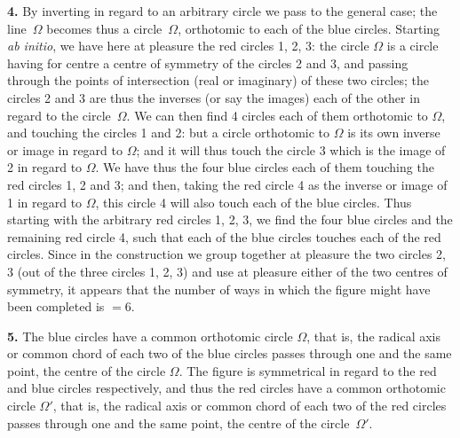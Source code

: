 \documentclass[12pt,a4paper]{article}
\begin{document}
\textbf{4.} By inverting in regard to an arbitrary circle we pass to the general case; the line~$\Omega$ becomes thus a circle~$\Omega$, orthotomic to each of the blue circles. Starting \textit{ab initio}, we have here at pleasure the red circles 1, 2, 3: the circle $\Omega$ is a circle having for centre a centre of symmetry of the circles 2 and 3, and passing through the points of intersection (real or imaginary) of these two circles; the circles 2 and 3 are thus the inverses (or say the images) each of the other in regard to the circle~$\Omega$. We can then find 4 circles each of them orthotomic to $\Omega$, and touching the circles 1 and 2: but a circle orthotomic to $\Omega$ is its own inverse or image in regard to $\Omega$; and it will thus touch the circle 3 which is the image of 2 in regard to $\Omega$. We have thus the four blue circles each of them touching the red circles 1, 2 and 3; and then, taking the red circle 4 as the inverse or image of 1 in regard to $\Omega$, this circle 4 will also touch each of the blue circles. Thus starting with the arbitrary red circles 1, 2, 3, we find the four blue circles and the remaining red circle 4, such that each of the blue circles touches each of the red circles. Since in the construction we group together at pleasure the two circles 2, 3 (out of the three circles 1, 2, 3) and use at pleasure either of the two centres of symmetry, it appears that the number of ways in which the figure might have been completed is $=6$.

\textbf{5.} The blue circles have a common orthotomic circle $\Omega$, that is, the radical axis or common chord of each two of the blue circles passes through one and the same point, the centre of the circle $\Omega$. The figure is symmetrical in regard to the red and blue circles respectively, and thus the red circles have a common orthotomic circle $\Omega'$, that is, the radical axis or common chord of each two of the red circles passes through one and the same point, the centre of the circle~$\Omega'$.
\end{document}
